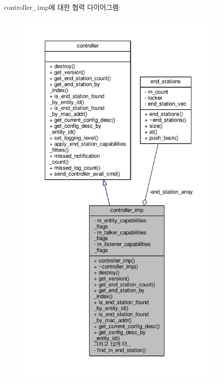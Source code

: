 controller\+\_\+imp에 대한 협력 다이어그램\+:
\nopagebreak
\begin{figure}[H]
\begin{center}
\leavevmode
\includegraphics[height=550pt]{classavdecc__lib_1_1controller__imp__coll__graph}
\end{center}
\end{figure}
